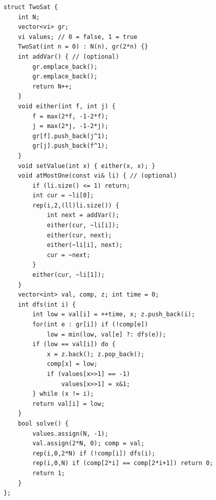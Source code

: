 \begin{lstlisting}
struct TwoSat {
    int N;
    vector<vi> gr;
    vi values; // 0 = false, 1 = true
    TwoSat(int n = 0) : N(n), gr(2*n) {}
    int addVar() { // (optional)
        gr.emplace_back();
        gr.emplace_back();
        return N++;
    }
    void either(int f, int j) {
        f = max(2*f, -1-2*f);
        j = max(2*j, -1-2*j);
        gr[f].push_back(j^1);
        gr[j].push_back(f^1);
    }
    void setValue(int x) { either(x, x); }
    void atMostOne(const vi& li) { // (optional)
        if (li.size() <= 1) return;
        int cur = ~li[0];
        rep(i,2,(ll)li.size()) {
            int next = addVar();
            either(cur, ~li[i]);
            either(cur, next);
            either(~li[i], next);
            cur = ~next;
        }
        either(cur, ~li[1]);
    }
    vector<int> val, comp, z; int time = 0;
    int dfs(int i) {
        int low = val[i] = ++time, x; z.push_back(i);
        for(int e : gr[i]) if (!comp[e])
            low = min(low, val[e] ?: dfs(e));
        if (low == val[i]) do {
            x = z.back(); z.pop_back();
            comp[x] = low;
            if (values[x>>1] == -1)
                values[x>>1] = x&1;
        } while (x != i);
        return val[i] = low;
    }
    bool solve() {
        values.assign(N, -1);
        val.assign(2*N, 0); comp = val;
        rep(i,0,2*N) if (!comp[i]) dfs(i);
        rep(i,0,N) if (comp[2*i] == comp[2*i+1]) return 0;
        return 1;
    }
};
\end{lstlisting}



